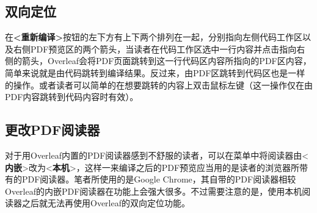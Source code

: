 \subsection{双向定位}

在\textbf{<重新编译>}按钮的左下方有上下两个排列在一起，分别指向左侧代码工作区以及右侧PDF预览区的两个箭头，当读者在代码工作区选中一行内容并点击指向右侧的箭头，Overleaf会将PDF页面跳转到这一行代码区内容所指向的PDF区内容，简单来说就是由代码跳转到编译结果。反过来，由PDF区跳转到代码区也是一样的操作。或者读者可以简单的在想要跳转的内容上双击鼠标左键（这一操作仅在由PDF内容跳转到代码内容时有效）。

\subsection{更改PDF阅读器}

对于用Overleaf内置的PDF阅读器感到不舒服的读者，可以在菜单中将阅读器由<\textbf{内嵌}>改为<\textbf{本机}>，这样一来编译之后的PDF预览应当用的是读者的浏览器所带有的PDF阅读器。笔者所使用的是Google Chrome，其自带的PDF阅读器相较Overleaf的内嵌PDF阅读器在功能上会强大很多。不过需要注意的是，使用本机阅读器之后就无法再使用Overleaf的双向定位功能。

